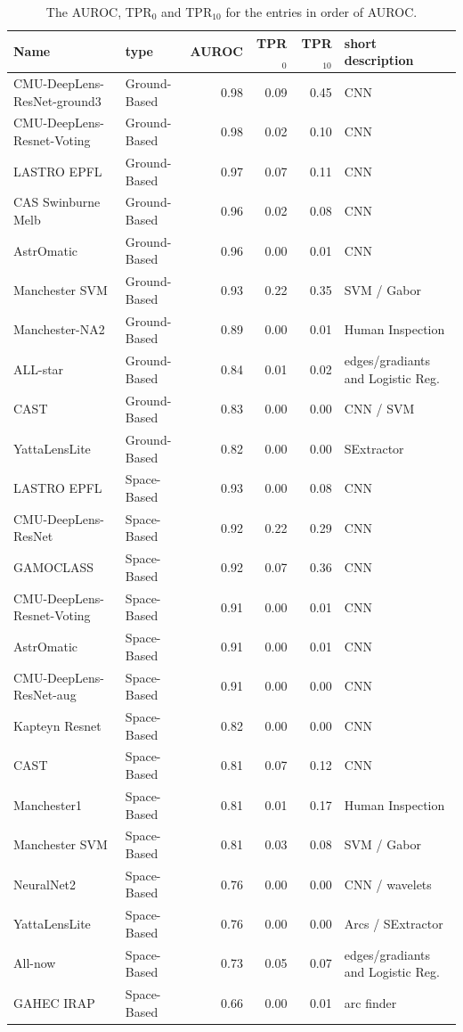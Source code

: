 \documentclass{aa}
\begin{document}
\begin{table}
\centering
\begin{tabular}{llrrrl}
  \hline
  Name & type & AUROC & TPR$_0$ & TPR$_{10}$ & short description \\ 
  \hline
 CMU-DeepLens-ResNet-ground3 & Ground-Based & 0.98 & 0.09 & 0.45 & CNN \\ 
  CMU-DeepLens-Resnet-Voting & Ground-Based & 0.98 & 0.02 & 0.10 & CNN \\ 
  LASTRO EPFL & Ground-Based & 0.97 & 0.07 & 0.11 & CNN \\ 
  CAS Swinburne Melb & Ground-Based & 0.96 & 0.02 & 0.08 & CNN \\ 
  AstrOmatic & Ground-Based & 0.96 & 0.00 & 0.01 & CNN \\ 
  Manchester SVM & Ground-Based & 0.93 & 0.22 & 0.35 & SVM / Gabor \\ 
  Manchester-NA2 & Ground-Based & 0.89 & 0.00 & 0.01 & Human Inspection \\ 
   ALL-star & Ground-Based & 0.84 & 0.01 & 0.02 & edges/gradiants and Logistic Reg. \\ 
   CAST & Ground-Based & 0.83 & 0.00 & 0.00 & CNN / SVM \\ 
   YattaLensLite & Ground-Based & 0.82 & 0.00 & 0.00 & SExtractor \\ 
   LASTRO EPFL & Space-Based & 0.93 & 0.00 & 0.08 & CNN \\ 
  CMU-DeepLens-ResNet & Space-Based & 0.92 & 0.22 & 0.29 & CNN \\ 
   GAMOCLASS & Space-Based & 0.92 & 0.07 & 0.36 & CNN \\ 
  CMU-DeepLens-Resnet-Voting & Space-Based & 0.91 & 0.00 & 0.01 & CNN \\ 
  AstrOmatic & Space-Based & 0.91 & 0.00 & 0.01 & CNN \\ 
   CMU-DeepLens-ResNet-aug & Space-Based & 0.91 & 0.00 & 0.00 & CNN \\ 
   Kapteyn Resnet & Space-Based & 0.82 & 0.00 & 0.00 & CNN \\ 
   CAST & Space-Based & 0.81 & 0.07 & 0.12 & CNN \\ 
  Manchester1 & Space-Based & 0.81 & 0.01 & 0.17 & Human Inspection \\ 
   Manchester SVM & Space-Based & 0.81 & 0.03 & 0.08 & SVM / Gabor \\ 
   NeuralNet2 & Space-Based & 0.76 & 0.00 & 0.00 & CNN / wavelets \\ 
   YattaLensLite & Space-Based & 0.76 & 0.00 & 0.00 & Arcs / SExtractor \\ 
   All-now & Space-Based & 0.73 & 0.05 & 0.07 & edges/gradiants and Logistic Reg. \\ 
  GAHEC IRAP & Space-Based & 0.66 & 0.00 & 0.01 & arc finder \\ 
   \hline
\end{tabular}
\caption{The AUROC, TPR$_0$ and TPR$_{10}$ for the entries in order of AUROC.}
\label{table:AUROC}
\end{table}
\end{document}
